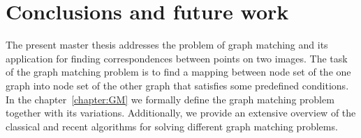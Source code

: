 \chapter{Conclusions and future work} \label{chapter:conclusions}
The present master thesis addresses the problem of graph matching and its application for finding correspondences between points on two images. The task of the graph matching problem is to find a mapping between node set of the one graph into node set of the other graph that satisfies some predefined conditions. In the chapter~\ref{chapter:GM} we formally define the graph matching problem together with its variations. Additionally, we provide an extensive overview of the classical and recent algorithms for solving different graph matching problems. 


